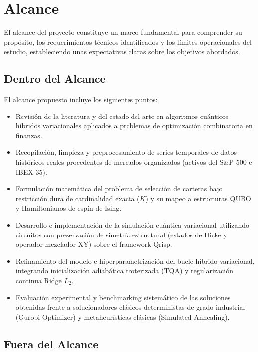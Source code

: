 \section{Alcance}

El alcance del proyecto constituye un marco fundamental para comprender su propósito, 
los requerimientos técnicos identificados y los límites operacionales del estudio, 
estableciendo unas expectativas claras sobre los objetivos abordados.

\subsection{Dentro del Alcance}

El alcance propuesto incluye los siguientes puntos:
\begin{itemize}
    \item Revisión de la literatura y del estado del arte en algoritmos cuánticos 
          híbridos variacionales aplicados a problemas de optimización combinatoria 
          en finanzas.
    \item Recopilación, limpieza y preprocesamiento de series temporales de datos 
          históricos reales procedentes de mercados organizados (activos del S\&P 500 
          e IBEX 35).
    \item Formulación matemática del problema de selección de carteras bajo 
          restricción dura de cardinalidad exacta ($K$) y su mapeo a estructuras QUBO 
          y Hamiltonianos de espín de Ising.
    \item Desarrollo e implementación de la simulación cuántica variacional 
          utilizando circuitos con preservación de simetría estructural (estados de 
          Dicke y operador mezclador XY) sobre el framework Qrisp.
    \item Refinamiento del modelo e hiperparametrización del bucle híbrido variacional, 
          integrando inicialización adiabática troterizada (TQA) y regularización continua 
          Ridge $L_2$.
    \item Evaluación experimental y benchmarking sistemático de las soluciones obtenidas 
          frente a solucionadores clásicos deterministas de grado industrial (Gurobi Optimizer) 
          y metaheurísticas clásicas (Simulated Annealing).
\end{itemize}

\subsection{Fuera del Alcance}

